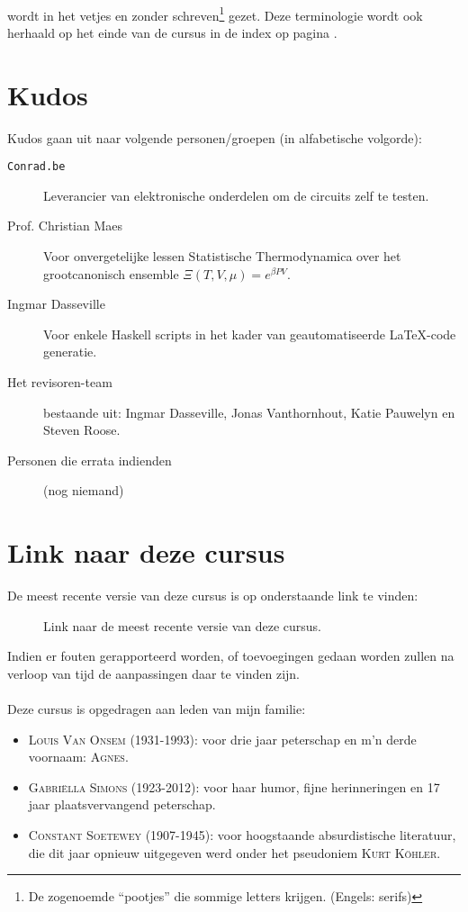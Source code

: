 \documentclass[a4paper,10pt,titlepage]{book}
\begin{document}
\begin{it}
\paragraph{}
 wordt in het vetjes en zonder schreven\footnote{De zogenoemde ``pootjes'' die sommige letters krijgen. (Engels: serifs)} gezet. Deze terminologie wordt ook herhaald op het einde van de cursus in de index op pagina \pageref{idx}.
\section*{Kudos}
Kudos gaan uit naar volgende personen/groepen (in alfabetische volgorde):
\begin{description}
 \item[\texttt{Conrad.be}] Leverancier van elektronische onderdelen om de circuits zelf te testen.
 \item[Prof. Christian Maes] Voor onvergetelijke lessen Statistische Thermodynamica over het grootcanonisch ensemble $\Xi\left(T,V,\mu\right)=e^{\beta PV}$.
 \item[Ingmar Dasseville] Voor enkele Haskell scripts in het kader van geautomatiseerde \LaTeX-code generatie.
 \item[Het revisoren-team] bestaande uit: Ingmar Dasseville, Jonas Vanthornhout, Katie Pauwelyn en Steven Roose.
 \item[Personen die errata indienden] (nog niemand)
\end{description}
\section*{Link naar deze cursus}
De meest recente versie van deze cursus is op onderstaande link te vinden:
\begin{figure}[H]
\centering
{}
\caption{Link naar de meest recente versie van deze cursus.}
\end{figure}
Indien er fouten gerapporteerd worden, of toevoegingen gedaan worden zullen na verloop van tijd de aanpassingen daar te vinden zijn.
\paragraph{}Deze cursus is opgedragen aan leden van mijn familie:
\begin{itemize}
 \item \textsc{Louis Van Onsem (1931-1993)}: voor drie jaar peterschap en m'n derde voornaam: \textsc{Agnes}.%
 \item \textsc{Gabri\"ella Simons (1923-2012)}: voor haar humor, fijne herinneringen en 17 jaar plaatsvervangend peterschap.
 \item \textsc{Constant Soetewey (1907-1945)}: voor hoogstaande absurdistische literatuur, die dit jaar opnieuw uitgegeven werd\cite{Kohler} onder het pseudoniem \textsc{Kurt K\"ohler}.
\end{itemize}
\end{it}
\end{document}
